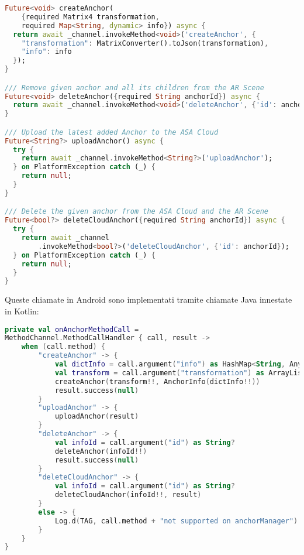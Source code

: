 \begin{lstlisting}[language=dart, label={lst:arplug_manager}, firstnumber=1,caption={\aplug{} \textit{create, delete, ulpoad, delete cloud anchor} tramite \textit{method channel}}]
Future<void> createAnchor(
    {required Matrix4 transformation,
    required Map<String, dynamic> info}) async {
  return await _channel.invokeMethod<void>('createAnchor', {
    "transformation": MatrixConverter().toJson(transformation),
    "info": info
  });
}

/// Remove given anchor and all its children from the AR Scene
Future<void> deleteAnchor({required String anchorId}) async {
  return await _channel.invokeMethod<void>('deleteAnchor', {'id': anchorId});
}

/// Upload the latest added Anchor to the ASA Cloud
Future<String?> uploadAnchor() async {
  try {
    return await _channel.invokeMethod<String?>('uploadAnchor');
  } on PlatformException catch (_) {
    return null;
  }
}

/// Delete the given anchor from the ASA Cloud and the AR Scene
Future<bool?> deleteCloudAnchor({required String anchorId}) async {
  try {
    return await _channel
        .invokeMethod<bool?>('deleteCloudAnchor', {'id': anchorId});
  } on PlatformException catch (_) {
    return null;
  }
}
\end{lstlisting} 

Queste chiamate in Android sono implementati tramite chiamate Java innestate in Kotlin:

\begin{lstlisting}[language=Kotlin, label={lst:android_channels}, firstnumber=1,caption={Android chiamate dei \textit{method channel} per effettuare \textit{create, delete, ulpoad, delete cloud anchor} tramite \textit{method channel}}]
private val onAnchorMethodCall =
MethodChannel.MethodCallHandler { call, result ->
    when (call.method) {
        "createAnchor" -> {
            val dictInfo = call.argument("info") as HashMap<String, Any>?
            val transform = call.argument("transformation") as ArrayList<Double>?
            createAnchor(transform!!, AnchorInfo(dictInfo!!))
            result.success(null)
        }
        "uploadAnchor" -> {
            uploadAnchor(result)
        }
        "deleteAnchor" -> {
            val infoId = call.argument("id") as String?
            deleteAnchor(infoId!!)
            result.success(null)
        }
        "deleteCloudAnchor" -> {
            val infoId = call.argument("id") as String?
            deleteCloudAnchor(infoId!!, result)
        }
        else -> {
            Log.d(TAG, call.method + "not supported on anchorManager")
        }
    }
}
\end{lstlisting}

